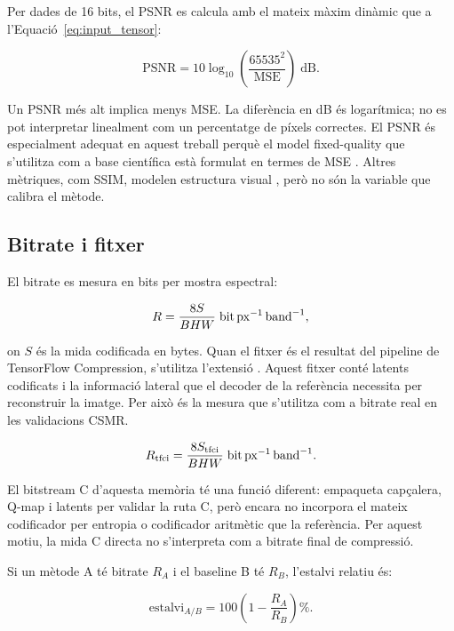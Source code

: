 Per dades de 16 bits, el PSNR es calcula amb el mateix màxim dinàmic que a
l'Equació~\ref{eq:input_tensor}:

\begin{equation}
\mathrm{PSNR}=10\log_{10}
\left(\frac{65535^2}{\mathrm{MSE}}\right)\;\mathrm{dB}.
\label{eq:psnr}
\end{equation}

Un PSNR més alt implica menys MSE. La diferència en dB és logarítmica; no es
pot interpretar linealment com un percentatge de píxels correctes. El PSNR és
especialment adequat en aquest treball perquè el model fixed-quality que
s'utilitza com a base científica està formulat en termes de MSE
\cite{mijares2024fixed}. Altres mètriques, com SSIM, modelen estructura visual
\cite{wang2004ssim}, però no són la variable que calibra el mètode.

\subsection{Bitrate i fitxer }

El bitrate es mesura en bits per mostra espectral:

\begin{equation}
R=\frac{8S}{BHW}\;\mathrm{bit}\,\mathrm{px}^{-1}\,\mathrm{band}^{-1},
\label{eq:bps_general}
\end{equation}

on $S$ és la mida codificada en bytes. Quan el fitxer és el resultat del
pipeline de TensorFlow Compression, s'utilitza l'extensió . Aquest
fitxer conté latents codificats i la informació lateral que el decoder de la
referència necessita per reconstruir la imatge. Per això és la mesura que
s'utilitza com a bitrate real en les validacions CSMR.

\begin{equation}
R_{\mathrm{tfci}}=
\frac{8S_{\mathrm{tfci}}}{BHW}\;\mathrm{bit}\,\mathrm{px}^{-1}\,\mathrm{band}^{-1}.
\label{eq:bps}
\end{equation}

El bitstream C d'aquesta memòria té una funció diferent: empaqueta capçalera,
Q-map i latents per validar la ruta C, però encara no incorpora el mateix
codificador per entropia o codificador aritmètic que la referència. Per aquest
motiu, la mida C directa no s'interpreta com a bitrate final de compressió.

Si un mètode A té bitrate $R_A$ i el baseline B té $R_B$, l'estalvi relatiu és:

\begin{equation}
\mathrm{estalvi}_{A/B}
=100\left(1-\frac{R_A}{R_B}\right)\%.
\label{eq:saving}
\end{equation}


